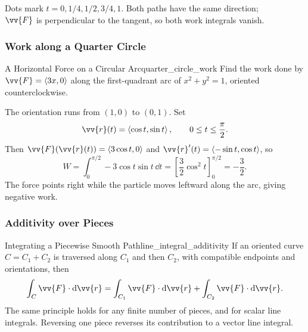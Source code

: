 \begin{center}
\par
\small Dots mark $t = 0,1/4,1/2,3/4,1$. Both paths have the same direction;\\
$\vv{F}$ is perpendicular to the tangent, so both work integrals vanish.
\end{center}

\newpage
\subsubsection{Work along a Quarter Circle}
\begin{problem}{A Horizontal Force on a Circular Arc}{quarter_circle_work}
Find the work done by $\vv{F} = \ang{3x,0}$ along the first-quadrant arc of $x^2 + y^2 = 1$, oriented counterclockwise.
\end{problem}
\begin{sol}
The orientation runs from $(1,0)$ to $(0,1)$. Set
\[
    \vv{r}(t) = \ang{\cos t,\sin t},\qquad 0 \le t \le \frac{\pi}{2}.
\]
Then $\vv{F}(\vv{r}(t)) = \ang{3\cos t,0}$ and $\vv{r}'(t) = \ang{-\sin t,\cos t}$, so
\[
    W = \int_0^{\pi/2} -3\cos t\sin t\,\dd{t}
    = \left[\frac{3}{2}\cos^2 t\right]_0^{\pi/2}
    = \boxed{-\frac{3}{2}}.
\]
The force points right while the particle moves leftward along the arc, giving negative work.
\end{sol}

\subsubsection{Additivity over Pieces}
\begin{theorem}{Integrating a Piecewise Smooth Path}{line_integral_additivity}
If an oriented curve $C = C_1 + C_2$ is traversed along $C_1$ and then $C_2$, with compatible endpoints and orientations, then
\[
    \int_C\vv{F}\cdot\dd{\vv{r}}
    = \int_{C_1}\vv{F}\cdot\dd{\vv{r}}
    + \int_{C_2}\vv{F}\cdot\dd{\vv{r}}.
\]
The same principle holds for any finite number of pieces, and for scalar line integrals. Reversing one piece reverses its contribution to a vector line integral.
\end{theorem}

